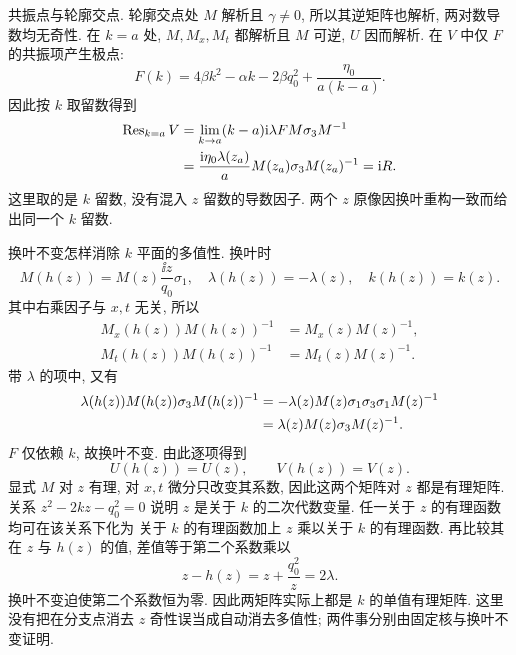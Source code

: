 \par\smallskip\noindent 共振点与轮廓交点.\quad
轮廓交点处 $M$ 解析且 $\gamma\ne0$,
所以其逆矩阵也解析, 两对数导数均无奇性.
在 $k=a$ 处, $M,M_x,M_t$ 都解析且 $M$ 可逆,
$ U$ 因而解析.
在 $ V$ 中仅 $F$ 的共振项产生极点:
\begin{equation*}
F(k)=4\beta k^2-\alpha k-2\beta q_0^2
+\dfrac{\eta_0}{a(k-a)}.
\end{equation*}
因此按 $k$ 取留数得到
\begin{equation*}
\begin{aligned}
\operatorname{Res}_{k=a} V
&=\lim\limits_{k\to a}(k-a)
\mathrm{i}\lambda F M\sigma_3 M^{-1}\\
&=\dfrac{\mathrm{i}\eta_0\lambda(z_a)}{a}
M(z_a)\sigma_3 M(z_a)^{-1}
=\mathrm{i} R.
\end{aligned}
\end{equation*}
这里取的是 $k$ 留数, 没有混入 $z$ 留数的导数因子.
两个 $z$ 原像因换叶重构一致而给出同一个 $k$ 留数.

\par\smallskip\noindent 换叶不变怎样消除 $k$ 平面的多值性.\quad
换叶时
\begin{equation*}
M(h(z))=M(z)\dfrac{\ii z}{q_0}\sigma_1,
\quad \lambda(h(z))=-\lambda(z),
\quad k(h(z))=k(z).
\end{equation*}
其中右乘因子与 $x,t$ 无关, 所以
\begin{equation*}
\begin{aligned}
M_x(h(z))M(h(z))^{-1}&=M_x(z)M(z)^{-1},\\
M_t(h(z))M(h(z))^{-1}&=M_t(z)M(z)^{-1}.
\end{aligned}
\end{equation*}
带 $\lambda$ 的项中, 又有
\begin{equation*}
\begin{aligned}
\lambda(h(z))M(h(z))\sigma_3 M(h(z))^{-1}
&=-\lambda(z)M(z)\sigma_1\sigma_3\sigma_1M(z)^{-1}\\
&=\lambda(z)M(z)\sigma_3 M(z)^{-1}.
\end{aligned}
\end{equation*}
$F$ 仅依赖 $k$, 故换叶不变.
由此逐项得到
\begin{equation*}
 U(h(z))= U(z),\qquad
 V(h(z))= V(z).
\end{equation*}
显式 $M$ 对 $z$ 有理, 对 $x,t$ 微分只改变其系数,
因此这两个矩阵对 $z$ 都是有理矩阵.
关系 $z^2-2kz-q_0^2=0$ 说明 $z$ 是关于 $k$ 的二次代数变量.
任一关于 $z$ 的有理函数均可在该关系下化为
关于 $k$ 的有理函数加上 $z$ 乘以关于 $k$ 的有理函数.
再比较其在 $z$ 与 $h(z)$ 的值,
差值等于第二个系数乘以
\begin{equation*}
z-h(z)=z+\dfrac{q_0^2}{z}=2\lambda.
\end{equation*}
换叶不变迫使第二个系数恒为零.
因此两矩阵实际上都是 $k$ 的单值有理矩阵.
这里没有把在分支点消去 $z$ 奇性误当成自动消去多值性;
两件事分别由固定核与换叶不变证明.

